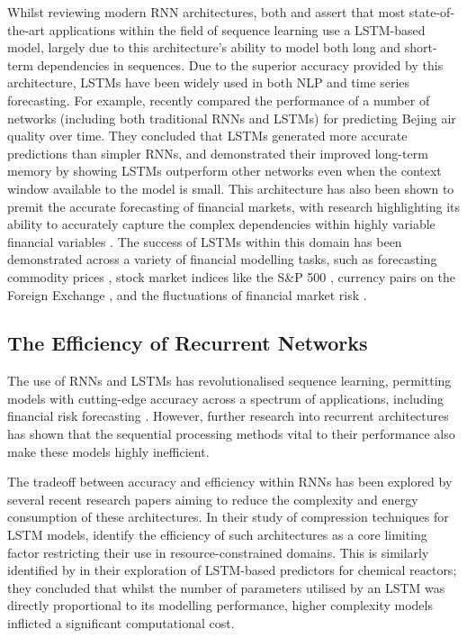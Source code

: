 \documentclass[a4paper, 11pt]{report}
\begin{document}
    Whilst reviewing modern RNN architectures, both \citet{lipton-2015} and \citet{yu-2019} assert that most state-of-the-art applications within the field of sequence learning use a LSTM-based model, largely due to this architecture's ability to model both long and short-term dependencies in sequences. Due to the superior accuracy provided by this architecture, LSTMs have been widely used in both NLP and time series forecasting. For example, \citet{shi-2022} recently compared the performance of a number of networks (including both traditional RNNs and LSTMs) for predicting Bejing air quality over time. They concluded that LSTMs generated more accurate predictions than simpler RNNs, and demonstrated their improved long-term memory by showing LSTMs outperform other networks even when the context window available to the model is small. This architecture has also been shown to premit the accurate forecasting of financial markets, with research highlighting its ability to accurately capture the complex dependencies within highly variable financial variables \citep{li-2017}. The success of LSTMs within this domain has been demonstrated across a variety of financial modelling tasks, such as forecasting commodity prices \citep{ly-2021}, stock market indices like the S\&P 500 \citep{fjellstrom-2022}, currency pairs on the Foreign Exchange \citep{qi-2021}, and the fluctuations of financial market risk \citep{du-2019}.


    \subsection{The Efficiency of Recurrent Networks}

    The use of RNNs and LSTMs has revolutionalised sequence learning, permitting models with cutting-edge accuracy across a spectrum of applications, including financial risk forecasting \citep{du-2019}. However, further research into recurrent architectures has shown that the sequential processing methods vital to their performance also make these models highly inefficient.

    The tradeoff between accuracy and efficiency within RNNs has been explored by several recent research papers aiming to reduce the complexity and energy consumption of these architectures. In their study of compression techniques for LSTM models, \citet{wang-2018} identify the efficiency of such architectures as a core limiting factor restricting their use in resource-constrained domains. This is similarly identified by \citet{zarzycki-2021} in their exploration of LSTM-based predictors for chemical reactors; they concluded that whilst the number of parameters utilised by an LSTM was directly proportional to its modelling performance, higher complexity models inflicted a significant computational cost. 
\end{document}

